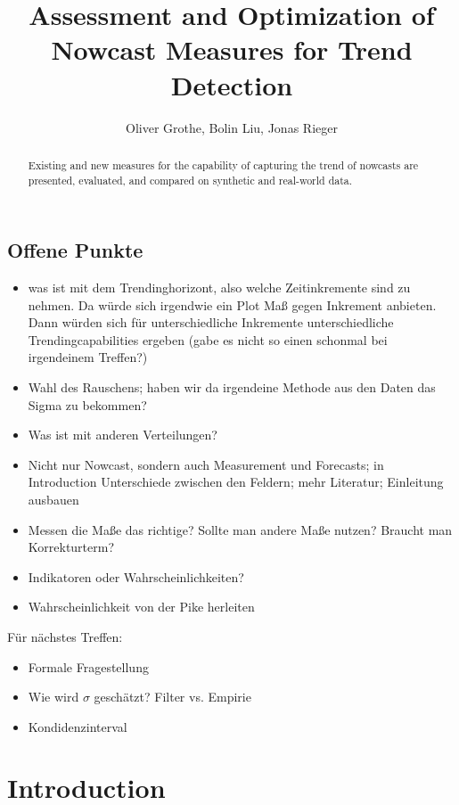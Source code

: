 \documentclass[oneside]{article}
\title{Assessment and Optimization of Nowcast Measures for Trend Detection}
\author{Oliver Grothe, Bolin Liu, Jonas Rieger}
\theoremstyle{plain}%
\theoremstyle{definition}
\begin{document}
\maketitle

\begin{abstract}
Existing and new measures for the capability of capturing the trend of nowcasts are presented, evaluated, and compared on synthetic and real-world data.
\end{abstract}

\subsection*{Offene Punkte}

\begin{itemize}
    \item was ist mit dem Trendinghorizont, also welche Zeitinkremente sind zu nehmen. Da würde sich irgendwie ein Plot Maß gegen Inkrement anbieten. Dann würden sich für unterschiedliche Inkremente unterschiedliche Trendingcapabilities ergeben (gabe es nicht so einen schonmal bei irgendeinem Treffen?)
    \item Wahl des Rauschens; haben wir da irgendeine Methode aus den Daten das Sigma zu bekommen?
    \item Was ist mit anderen Verteilungen?
    \item Nicht nur Nowcast, sondern auch Measurement und Forecasts; in Introduction Unterschiede zwischen den Feldern; mehr Literatur; Einleitung ausbauen
    \item Messen die Maße das richtige? Sollte man andere Maße nutzen? Braucht man Korrekturterm?
    \item Indikatoren oder Wahrscheinlichkeiten?
    \item Wahrscheinlichkeit von der Pike herleiten
\end{itemize}

Für nächstes Treffen:
\begin{itemize}
    \item Formale Fragestellung
    \item Wie wird $\sigma$ geschätzt? Filter vs. Empirie
    \item Kondidenzinterval     
\end{itemize}


\listoftodos


\section{Introduction}
\end{document}
